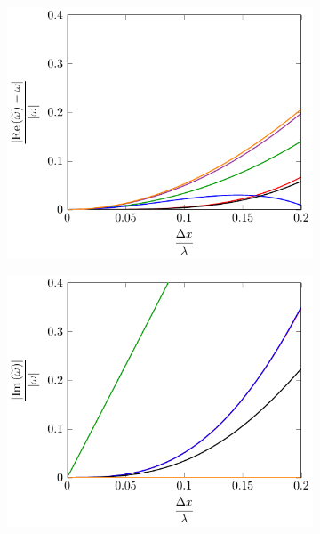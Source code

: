 \begin{figure}
	\centering
	\begin{subfigure}{0.5\textwidth}
		\includegraphics[width=\textwidth]{./chp4/figures/Dispu0khFillRez.pdf}
	\end{subfigure}%
	\begin{subfigure}{0.5\textwidth}
		\includegraphics[width=\textwidth]{./chp4/figures/Dispu0khFillImz.pdf}
	\end{subfigure}
	\begin{subfigure}{0.5\textwidth}

\end{subfigure}
\end{figure}
